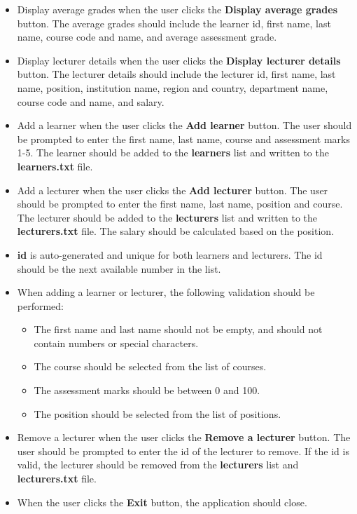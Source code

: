 \documentclass{article}
\begin{document}
\begin{itemize}
\begin{itemize}
        \item Display average grades when the user clicks the \textbf{Display average grades} button. The average grades should include the learner id, first name, last name, course code and name, and average assessment grade.
        \item Display lecturer details when the user clicks the \textbf{Display lecturer details} button. The lecturer details should include the lecturer id, first name, last name, position, institution name, region and country, department name, course code and name, and salary.
        \item Add a learner when the user clicks the \textbf{Add learner} button. The user should be prompted to enter the first name, last name, course and assessment marks 1-5. The learner should be added to the \textbf{learners} list and written to the \textbf{learners.txt} file. 
        \item Add a lecturer when the user clicks the \textbf{Add lecturer} button. The user should be prompted to enter the first name, last name, position and course. The lecturer should be added to the \textbf{lecturers} list and written to the \textbf{lecturers.txt} file. The salary should be calculated based on the position.
        \item \textbf{id} is auto-generated and unique for both learners and lecturers. The id should be the next available number in the list.
        \item When adding a learner or lecturer, the following validation should be performed:
        \begin{itemize}
            \item The first name and last name should not be empty, and should not contain numbers or special characters.
            \item The course should be selected from the list of courses.
            \item The assessment marks should be between 0 and 100.
            \item The position should be selected from the list of positions.
        \end{itemize}
        \item Remove a lecturer when the user clicks the \textbf{Remove a lecturer} button. The user should be prompted to enter the id of the lecturer to remove. If the id is valid, the lecturer should be removed from the \textbf{lecturers} list and \textbf{lecturers.txt} file.
        \item When the user clicks the \textbf{Exit} button, the application should close.
    \end{itemize}
\end{itemize}
\end{document}
